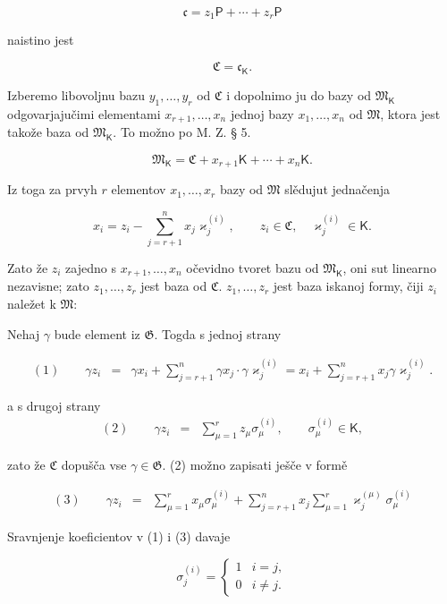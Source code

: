 \documentclass[11pt]{article}
\begin{document}
\[
\mathfrak c=z_1\mathsf P+\cdots+z_r\mathsf P
\]

naistino jest

\[
\mathfrak C=\mathfrak c_{\mathsf K}.
\]

Izberemo libovoljnu bazu \(y_1,\ldots,y_r\) od \(\mathfrak C\) i dopolnimo ju do bazy od \(\mathfrak M_{\mathsf K}\) odgovarjajučimi elementami \(x_{r+1},\ldots,x_n\) jednoj bazy \(x_1,\ldots,x_n\) od \(\mathfrak M\), ktora jest takože baza od \(\mathfrak M_{\mathsf K}\). To možno po M. Z. § 5.

\[
\mathfrak M_{\mathsf K}=\mathfrak C+x_{r+1}\mathsf K+\cdots+x_n\mathsf K.
\]

Iz toga za prvyh \(r\) elementov \(x_1,\ldots,x_r\) bazy od \(\mathfrak M\) slědujut jednačenja

\[
x_i=z_i-\sum_{j=r+1}^{n}x_j\varkappa_j^{(i)},\qquad
z_i\in\mathfrak C,\quad \varkappa_j^{(i)}\in\mathsf K.
\]

Zato že \(z_i\) zajedno s \(x_{r+1},\ldots,x_n\) očevidno tvoret bazu od \(\mathfrak M_{\mathsf K}\), oni sut linearno nezavisne; zato \(z_1,\ldots,z_r\) jest baza od \(\mathfrak C\). \(z_1,\ldots,z_r\) jest baza iskanoj formy, čiji \(z_i\) naležet k \(\mathfrak M\):

Nehaj \(\gamma\) bude element iz \(\mathfrak G\). Togda s jednoj strany

\[
\begin{array}{rcl}
(1)\qquad \gamma z_i
&=&\gamma x_i+\displaystyle\sum_{j=r+1}^{n}\gamma x_j\cdot \gamma\varkappa_j^{(i)}
=x_i+\displaystyle\sum_{j=r+1}^{n}x_j\gamma\varkappa_j^{(i)}.
\end{array}
\]

a s drugoj strany
\[
\begin{array}{rcl}
(2)\qquad \gamma z_i&=&\displaystyle\sum_{\mu=1}^{r}z_\mu\sigma_\mu^{(i)},
\qquad \sigma_\mu^{(i)}\in\mathsf K,
\end{array}
\]

zato že \(\mathfrak C\) dopušča vse \(\gamma\in\mathfrak G\). (2) možno zapisati ješče v formě

\[
\begin{array}{rcl}
(3)\qquad \gamma z_i
&=&\displaystyle\sum_{\mu=1}^{r}x_\mu\sigma_\mu^{(i)}
+\displaystyle\sum_{j=r+1}^{n}x_j\sum_{\mu=1}^{r}\varkappa_j^{(\mu)}\sigma_\mu^{(i)}
\end{array}
\]

Sravnjenje koeficientov v (1) i (3) davaje

\[
\sigma_j^{(i)}=
\begin{cases}
1 & i=j,\\
0 & i\ne j.
\end{cases}
\]
\end{document}
